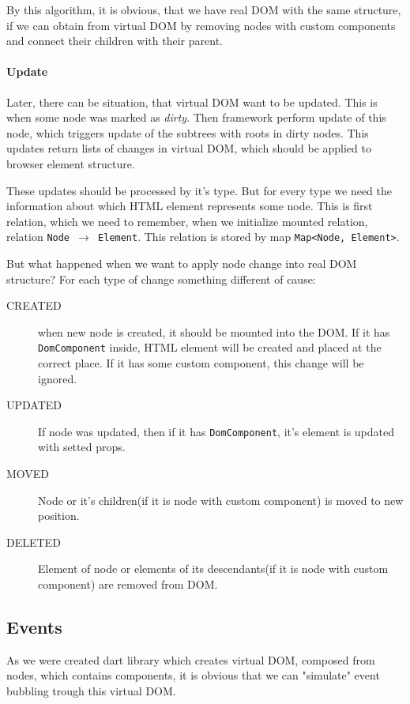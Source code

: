 \documentclass[oneside, 12pt]{book}
\begin{document}
        By this algorithm, it is obvious, that we have real DOM with the same structure, 
        if we can obtain from virtual DOM by removing nodes with custom components 
        and connect their children with their parent.

      \paragraph{Update}\label{par:our-architecture-rendering-browser-update} 
        Later, there can be situation, that virtual DOM want to be updated. 
        This is when some node was marked as \textit{dirty}.
        Then framework perform update of this node, 
        which triggers update of the subtrees with roots in dirty nodes.
        This updates return lists of changes in virtual DOM, 
        which should be applied to browser element structure.

        These updates should be processed by it's type. 
        But for every type we need the information about which HTML element represents some node. 
        This is first relation, which we need to remember, when we initialize mounted relation, 
        relation \mbox{\texttt{Node $\rightarrow$ Element}}. 
        This relation is stored by map \texttt{Map<Node, Element>}.

        But what happened when we want to apply node change into real DOM structure?
        For each type of change something different of cause:
        \begin{description}
          \item[CREATED]
            when new node is created, it should be mounted into the DOM. 
            If it has \texttt{DomComponent} inside, HTML element will be created and placed at the correct place. 
            If it has some custom component, this change will be ignored. 
          \item[UPDATED]
            If node was updated, then if it has \texttt{DomComponent}, it's element is updated with setted props.
          \item[MOVED]
            Node or it's children(if it is node with custom component) is moved to new position.
          \item[DELETED]
            Element of node or elements of its descendants(if it is node with custom component) are removed from DOM.
        \end{description}

  \subsection{Events}\label{subsec:our-architecture-events}
    As we were created dart library which creates virtual DOM, composed from nodes, which contains components, 
    it is obvious that we can "simulate" event bubbling trough this virtual DOM. 
\end{document}

